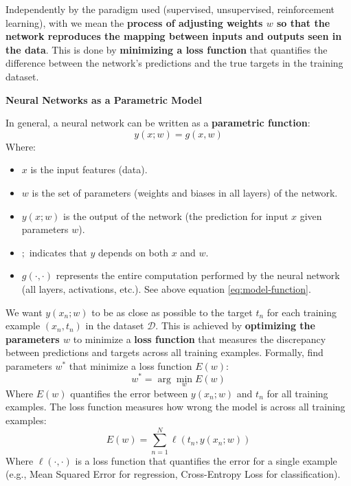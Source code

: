 \highspace
Independently by the paradigm used (supervised, unsupervised, reinforcement learning), with  we mean the \textbf{process of adjusting weights $w$ so that the network reproduces the mapping between inputs and outputs seen in the data}. This is done by \textbf{minimizing a loss function} that quantifies the difference between the network's predictions and the true targets in the training dataset.

\highspace
\begin{flushleft}
    \textcolor{Green3}{ \textbf{Neural Networks as a Parametric Model}}
\end{flushleft}
In general, a neural network can be written as a \textbf{parametric function}:
\begin{equation}
    y\left(x; w\right) = g\left(x, w\right)
\end{equation}
Where:
\begin{itemize}
    \item $x$ is the input features (data).
    \item $w$ is the set of parameters (weights and biases in all layers) of the network.
    \item $y\left(x; w\right)$ is the output of the network (the prediction for input $x$ given parameters $w$).
    \item $;$ indicates that $y$ depends on both $x$ and $w$.
    \item $g(\cdot, \cdot)$ represents the entire computation performed by the neural network (all layers, activations, etc.). See above equation \ref{eq:model-function}.
\end{itemize}
We want $y\left(x_{n}; w\right)$ to be as close as possible to the target $t_{n}$ for each training example $\left(x_{n}, t_{n}\right)$ in the dataset $\mathcal{D}$. This is achieved by \textbf{optimizing the parameters $w$} to minimize a \textbf{loss function} that measures the discrepancy between predictions and targets across all training examples. Formally, find parameters $w^{*}$ that minimize a loss function $E(w)$:
\begin{equation*}
    w^{*} = \arg\min_{w} E\left(w\right)
\end{equation*}
Where $E(w)$ quantifies the error between $y\left(x_{n}; w\right)$ and $t_{n}$ for all training examples. The loss function measures how wrong the model is across all training examples:
\begin{equation}
    E\left(w\right) = \displaystyle\sum_{n=1}^{N} \ell\left(t_{n}, y\left(x_{n}; w\right)\right)
\end{equation}
Where $\ell(\cdot, \cdot)$ is a loss function that quantifies the error for a single example (e.g., Mean Squared Error for regression, Cross-Entropy Loss for classification).

